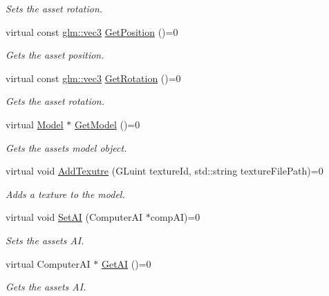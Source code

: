 \begin{CompactItemize}
\begin{CompactList}\small\item\em Sets the asset rotation. \item\end{CompactList}\item 
virtual const \hyperlink{group__core__types_g1c47e8b3386109bc992b6c48e91b0be7}{glm::vec3} \hyperlink{class_i_game_asset_d625e23f7bd5d32c41855cc72e339f10}{GetPosition} ()=0
\begin{CompactList}\small\item\em Gets the asset position. \item\end{CompactList}\item 
virtual const \hyperlink{group__core__types_g1c47e8b3386109bc992b6c48e91b0be7}{glm::vec3} \hyperlink{class_i_game_asset_b17b3face9a76d70d3b6537b19f7ba5b}{GetRotation} ()=0
\begin{CompactList}\small\item\em Gets the asset rotation. \item\end{CompactList}\item 
virtual \hyperlink{class_model}{Model} $\ast$ \hyperlink{class_i_game_asset_eee1dc987bfe4df399b6d9878b01b094}{GetModel} ()=0
\begin{CompactList}\small\item\em Gets the assets model object. \item\end{CompactList}\item 
virtual void \hyperlink{class_i_game_asset_cb5ed97729be8b36021acca98073b420}{AddTexutre} (GLuint textureId, std::string textureFilePath)=0
\begin{CompactList}\small\item\em Adds a texture to the model. \item\end{CompactList}\item 
virtual void \hyperlink{class_i_game_asset_5b487893a4ef77c9522b3d8ff68c4e25}{SetAI} (ComputerAI $\ast$compAI)=0
\begin{CompactList}\small\item\em Sets the assets AI. \item\end{CompactList}\item 
virtual ComputerAI $\ast$ \hyperlink{class_i_game_asset_41a27cd2c0dc69ea041b69d3a60dfc22}{GetAI} ()=0
\begin{CompactList}\small\item\em Gets the assets AI. \item\end{CompactList}\end{CompactItemize}
